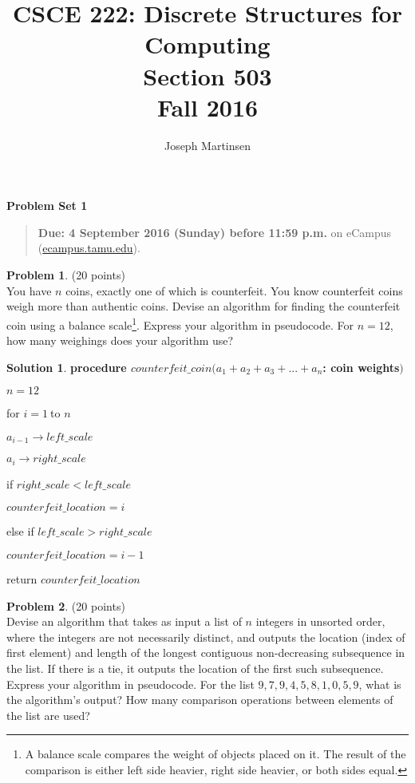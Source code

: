\documentclass{article}
\title{CSCE 222: Discrete Structures for Computing\\Section 503\\Fall 2016}
\author{Joseph Martinsen}
\theoremstyle{definition}
\newtheorem{problem}{Problem}
\newtheorem*{solution}{Solution}
\newcommand{\problemset}[1]{\begin{center}\textbf{Problem Set #1}\end{center}}
\newcommand{\duedate}[1]{\begin{quote}\textbf{Due: #1} on eCampus (\url{ecampus.tamu.edu}).\end{quote}}
\begin{document}
\maketitle

\problemset{1}

\duedate{4 September 2016 (Sunday) before 11:59 p.m.}

\bigskip

\begin{problem} (20 points)\\
You have $n$ coins, exactly one of which is counterfeit.  You know counterfeit coins weigh more than authentic coins.  Devise an algorithm for finding the counterfeit coin using a balance scale\footnote{A balance scale compares the weight of objects placed on it.  The result of the comparison is either left side heavier, right side heavier, or both sides equal.}.  Express your algorithm in pseudocode.  For $n=12$, how many weighings does your algorithm use? 
\end{problem}

\begin{solution}

\item \bf procedure $counterfeit\_coin(a_{1}+a_{2}+a_{3}+...+a_{n}$: coin weights$)$

$n=12$

for $i=1\ $to $n$

\qquad $a_{i-1}\rightarrow left\_scale$

\qquad $a_{i}\rightarrow right\_scale$ 

\qquad if $right\_scale<left\_scale$

\qquad \qquad $counterfeit\_location=i$

\qquad else if $left\_scale>right\_scale$

\qquad \qquad $counterfeit\_location=i-1$

return $counterfeit\_location$

\end{solution}

\newpage

\begin{problem} (20 points)\\
Devise an algorithm that takes as input a list of $n$ integers in unsorted order, where the integers are not necessarily distinct, and outputs the location (index of first element) and length of the longest contiguous non-decreasing subsequence in the list.  If there is a tie, it outputs the location of the first such subsequence.  Express your algorithm in pseudocode.  For the list $9,7,9,4,5,8,1,0,5,9$, what is the algorithm's output? How many comparison operations between elements of the list are used?
\end{problem}
\end{document}
